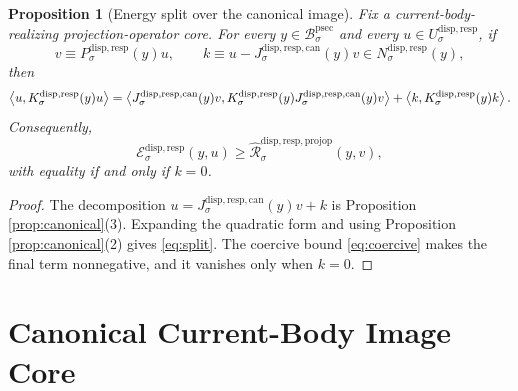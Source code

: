\documentclass[11pt]{article}
\newcommand{\ProtoSectionBody}[1]{\mathcal B_{#1}^{\mathrm{psec}}}
\newcommand{\SubstrateCarrier}[1]{U_{#1}^{\mathrm{disp,resp}}}
\newcommand{\SubstrateProjection}[1]{P_{#1}^{\mathrm{disp,resp}}}
\newcommand{\SubstrateOperator}[1]{K_{#1}^{\mathrm{disp,resp}}}
\newcommand{\SubstrateKernel}[1]{N_{#1}^{\mathrm{disp,resp}}}
\newcommand{\SubstrateEnergy}[1]{\mathscr E_{#1}^{\mathrm{disp,resp}}}
\newcommand{\CanonicalLift}[1]{J_{#1}^{\mathrm{disp,resp,can}}}
\newcommand{\CoreForcedBodyResponse}[1]{\widehat{\mathscr R}_{#1}^{\mathrm{disp,resp,projop}}}
\newtheorem{proposition}{Proposition}
\begin{document}
\begin{proposition}[Energy split over the canonical image]
\label{prop:split}
Fix a current-body-realizing projection-operator core. For every \(y\in\ProtoSectionBody{\sigma}\) and every \(u\in\SubstrateCarrier{\sigma}\), if
\[
v\equiv\SubstrateProjection{\sigma}(y)u,
\qquad
k\equiv u-\CanonicalLift{\sigma}(y)v\in\SubstrateKernel{\sigma}(y),
\]
then
\begin{equation}
\ev{u,\SubstrateOperator{\sigma}(y)u}
=
\ev{
\CanonicalLift{\sigma}(y)v,
\SubstrateOperator{\sigma}(y)\CanonicalLift{\sigma}(y)v
}
+
\ev{k,\SubstrateOperator{\sigma}(y)k}.
\label{eq:split}
\end{equation}
Consequently,
\[
\SubstrateEnergy{\sigma}(y,u)
\ge
\CoreForcedBodyResponse{\sigma}(y,v),
\]
with equality if and only if \(k=0\).
\end{proposition}

\begin{proof}
The decomposition \(u=\CanonicalLift{\sigma}(y)v+k\) is Proposition \ref{prop:canonical}(3). Expanding the quadratic form and using Proposition \ref{prop:canonical}(2) gives \eqref{eq:split}. The coercive bound \eqref{eq:coercive} makes the final term nonnegative, and it vanishes only when \(k=0\).
\end{proof}

\section{Canonical Current-Body Image Core}
\end{document}
